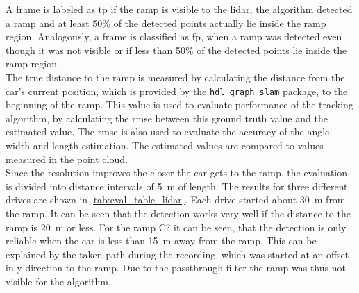 A frame is labeled as \gls{tp} if the ramp is visible to the \gls{lidar}, the algorithm detected a ramp and at least 50\% of the detected points actually lie inside the ramp region.
Analogously, a frame is classified as \gls{fp}, when a ramp was detected even though it was not visible or if less than 50\% of the detected points lie inside the ramp region.\\
The true distance to the ramp is measured by calculating the distance from the car's current position, which is provided by the \texttt{hdl\_graph\_slam} package, to the beginning of the ramp.
This value is used to evaluate performance of the tracking algorithm, by calculating the \gls{rmse} between this ground truth value and the estimated value.
The \gls{rmse} is also used to evaluate the accuracy of the angle, width and length estimation.
The estimated values are compared to values measured in the point cloud.\\
Since the resolution improves the closer the car gets to the ramp, the evaluation is divided into distance intervals of \SI{5}{\metre} of length.
The results for three different drives are shown in \cref{tab:eval_table_lidar}.
Each drive started about \SI{30}{\metre} from the ramp.
It can be seen that the detection works very well if the distance to the ramp is \SI{20}{\metre} or less.
For the ramp C? it can be seen, that the detection is only reliable when the car is less than \SI{15}{\metre} away from the ramp.
This can be explained by the taken path during the recording, which was started at an offset in y-direction to the ramp.
Due to the passthrough filter the ramp was thus not visible for the algorithm.\\
